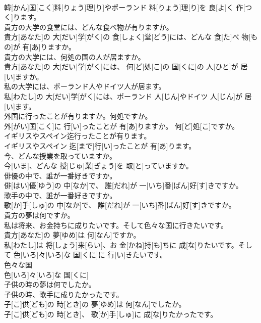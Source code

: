 \documentclass[8pt]{extreport}
\begin{document}
\begin{CJK}{UTF8}{min}
\\	韓[かん]国[こく]料[りょう]理[り]やポーランド 料[りょう]理[り]を 良[よ]く 作[つく]ります。
\\	貴方の大学の食堂には、どんな食べ物が有りますか。	
\\	貴方[あなた]の 大[だい]学[がく]の 食[しょく]堂[どう]には、どんな 食[た]べ 物[もの]が 有[あ]りますか。
\\	貴方の大学には、何処の国の人が居ますか。	
\\	貴方[あなた]の 大[だい]学[がく]には、 何[ど]処[こ]の 国[くに]の 人[ひと]が 居[い]ますか。
\\	私の大学には、ポーランド人やドイツ人が居ます。	
\\	私[わたし]の 大[だい]学[がく]には、ポーランド 人[じん]やドイツ 人[じん]が 居[い]ます。
\\	外国に行ったことが有りますか。何処ですか。	
\\	外[がい]国[こく]に 行[い]ったことが 有[あ]りますか。 何[ど]処[こ]ですか。
\\	イギリスやスペイン迄行ったことが有ります。	
\\	イギリスやスペイン 迄[まで]行[い]ったことが 有[あ]ります。
\\	今、どんな授業を取っていますか。	
\\	今[いま]、どんな 授[じゅ]業[ぎょう]を 取[と]っていますか。
\\	俳優の中で、誰が一番好きですか。	
\\	俳[はい]優[ゆう]の 中[なか]で、 誰[だれ]が 一[いち]番[ばん]好[す]きですか。
\\	歌手の中で、誰が一番好きですか。	
\\	歌[か]手[しゅ]の 中[なか]で、 誰[だれ]が 一[いち]番[ばん]好[す]きですか。
\\	貴方の夢は何ですか。 
\\	私は将来、お金持ちに成りたいです。そして色々な国に行きたいです。	
\\	貴方[あなた]の 夢[ゆめ]は 何[なん]ですか。 
\\	私[わたし]は 将[しょう]来[らい]、お 金[かね]持[も]ちに 成[な]りたいです。そして 色[いろ]々[いろ]な 国[くに]に 行[い]きたいです。
\\	色々な国	
\\	色[いろ]々[いろ]な 国[くに]
\\	子供の時の夢は何でしたか。 
\\	子供の時、歌手に成りたかったです。	
\\	子[こ]供[ども]の 時[とき]の 夢[ゆめ]は 何[なん]でしたか。 
\\	子[こ]供[ども]の 時[とき]、 歌[か]手[しゅ]に 成[な]りたかったです。

\end{CJK}
\end{document}
